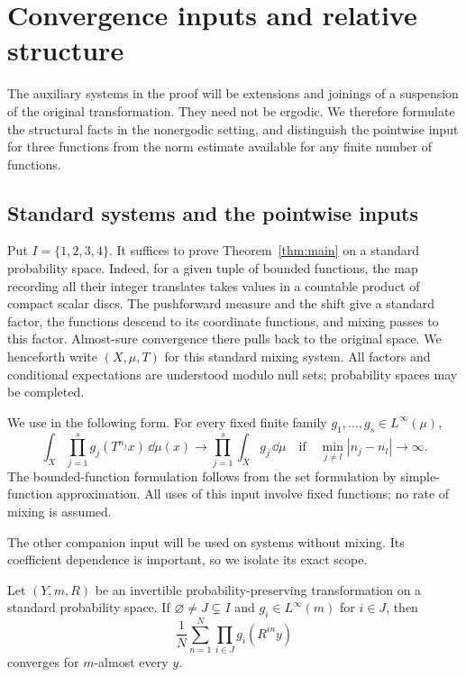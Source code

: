 \section{Convergence inputs and relative structure}
\label{sec:structure}

The auxiliary systems in the proof will be extensions and joinings of a
suspension of the original transformation.  They need not be ergodic.
We therefore formulate the structural facts in the nonergodic setting,
and distinguish the pointwise input for three functions from the norm
estimate available for any finite number of functions.

\subsection{Standard systems and the pointwise inputs}

Put $I=\{1,2,3,4\}$.  It suffices to prove
Theorem~\ref{thm:main} on a standard probability space.  Indeed, for a
given tuple of bounded functions, the map recording all their integer
translates takes values in a countable product of compact scalar discs.
The pushforward measure and the shift give a standard factor, the
functions descend to its coordinate functions, and mixing passes to
this factor.  Almost-sure convergence there pulls back to the original
space.  We henceforth write $(X,\mu,T)$ for this standard mixing system.
All factors and conditional expectations are understood modulo null
sets; probability spaces may be completed.

We use \cite[Theorem~1.1]{MixingCompanion} in the following
form.  For every fixed finite family $g_1,\ldots,g_s\in L^\infty(\mu)$,
\begin{equation}\label{eq:all-orders-input}
 \int_X\prod_{j=1}^s g_j(T^{n_j}x)\,\dd\mu(x)
 \longrightarrow \prod_{j=1}^s\int_Xg_j\,\dd\mu
 \quad\text{if}\quad \min_{j\ne l}|n_j-n_l|\longrightarrow\infty.
\end{equation}
The bounded-function formulation follows from the set formulation by
simple-function approximation.  All uses of this input involve fixed
functions; no rate of mixing is assumed.

The other companion input will be used on systems without mixing.
Its coefficient dependence is important, so we isolate its exact scope.

\begin{lemma}\label{lem:lower-length}
Let $(Y,m,R)$ be an invertible probability-preserving transformation on
a standard probability space.  If $\varnothing\ne J\subsetneq I$ and
$g_i\in L^\infty(m)$ for $i\in J$, then
\[
 \frac1N\sum_{n=1}^N\prod_{i\in J}g_i(R^{in}y)
\]
converges for $m$-almost every $y$.
\end{lemma}

